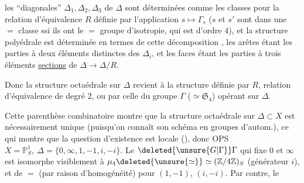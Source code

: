 les ``diagonales'' \(\Delta_1,\Delta_2,\Delta_3\) de \(\Delta\) sont déterminées   comme les classes pour la relation d'équivalence \(R\) définie par l'application \(s\mapsto\Gamma_s\) (\(s\) et \(s'\) sont dans une \(=\) classe ssi ils ont le \(=\) groupe d'isotropie, qui est  d'ordre \(4\)), et la structure polyédrale est déterminée en termes de cette décomposition , les arêtes étant les  parties à deux éléments distinctes des \(\Delta_i\), et les  faces étant les parties à trois éléments \uline{sections} de \(\Delta\longrightarrow\Delta/R\).

Donc la structure octaédrale sur \(\Delta\) revient à la structure  définie par \(R\), relation d'équivalence de degré \(2\), ou  par celle du groupe \(\Gamma\) (\(\simeq\mathfrak S_4\)) opérant sur \(\Delta\).

Cette parenthèse combinatoire montre que la structure octaédrale  sur \(\Delta\subset X\) est nécessairement unique (puisqu'on connaît son schéma en groupes d'autom.), ce qui montre que la question d'existence est locale (), donc OPS \(X=\mathbb P^1_S,\ \Delta=\{0,\infty,1,-1,i,-i\}\). Le   \(\deleted{\unsure{G|\Gamma}}\Gamma\) qui fixe \(0\) et \(\infty\) est isomorphe visiblement à \(\mu_4\deleted{\unsure{\simeq}}\simeq(\mathbb Z/4\mathbb Z)_S\) (générateur \(i\)),  et de \(=\) (par raison d'homogénéité) pour \((1,-1)\), \((i,-i)\). Par contre, le

